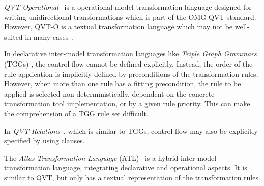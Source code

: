 \emph{QVT Operational}~\cite{QVT} is a operational model transformation language designed for writing unidirectional transformations which is part of the OMG QVT standard. %
However, QVT-O is a textual transformation language which may not be well-suited in many cases~\cite{Moo09}.

In declarative inter-model transformation languages like \emph{Triple Graph Grammars} (TGGs) \cite{Sch94}, the control flow cannot be defined explicitly.
Instead, the order of the rule application is implicitly defined by preconditions of the transformation rules.
However, when more than one rule has a fitting precondition, the rule to be applied is selected non-deterministically, dependent on the concrete transformation tool implementation, or by a given rule priority.
This can make the comprehension of a TGG rule set difficult.

In \emph{QVT Relations}~\cite{QVT}, which is similar to TGGs, control flow may also be explicitly specified by using  clauses.

The \emph{Atlas Transformation Language} (ATL)~\cite{ATL} is a hybrid inter-model transformation language, integrating declarative and operational aspects.
It is similar to QVT, but only has a textual representation of the transformation rules.

